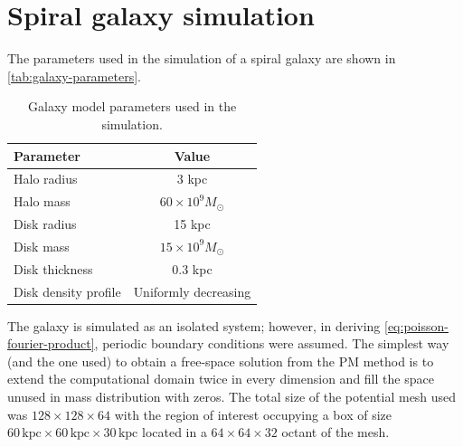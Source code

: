 \section{Spiral galaxy simulation}\label{sec:spiral-galaxy-sim}
The parameters used in the simulation of a spiral galaxy are shown in \autoref{tab:galaxy-parameters}.
\begin{table}[htp]
    \centering
    \caption{Galaxy model parameters used in the simulation.}
    \label{tab:galaxy-parameters}
    \begin{tabular}{lc}
        \toprule
        \textbf{Parameter}   & \textbf{Value}           \\
        \midrule
        Halo radius          & 3 kpc                    \\
        Halo mass            & $60 \times 10^9 M_\odot$ \\
        Disk radius          & 15 kpc                   \\
        Disk mass            & $15 \times 10^9 M_\odot$ \\
        Disk thickness       & 0.3 kpc                  \\
        Disk density profile & Uniformly decreasing     \\
        \bottomrule
    \end{tabular}
\end{table}
The galaxy is simulated as an isolated system; however, in deriving \autoref{eq:poisson-fourier-product}, periodic boundary conditions were assumed.
The simplest way (and the one used) to obtain a free-space solution from the PM method is to extend the computational domain twice in every dimension and fill the space unused in mass distribution with zeros.
The total size of the potential mesh used was $128 \times 128 \times 64$ with the region of interest occupying a box of size $60\, \text{kpc}\times 60\, \text{kpc}\times 30\, \text{kpc}$ located in a $64 \times 64 \times 32$ octant of the mesh.

